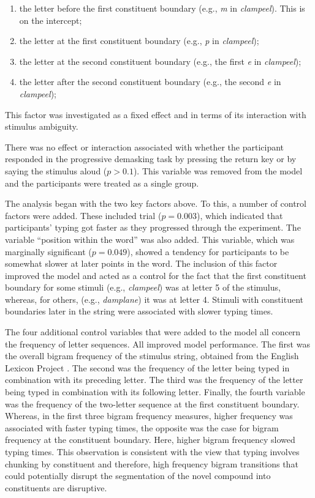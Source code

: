 \documentclass[output=paper]{langsci/langscibook}
\begin{document}
\begin{enumerate}
\item the letter before the first constituent boundary (e.g., \textit{m} in \textit{clampeel}). This is on the intercept; 
\item the letter at the first constituent boundary (e.g., \textit{p} in \textit{clampeel});
\item the letter at the second constituent boundary (e.g., the first \textit{e} in \textit{clampeel});
\item the letter after the second constituent boundary (e.g., the second \textit{e} in \textit{clampeel});
\end{enumerate}

This factor was investigated as a fixed effect and in terms of its interaction with stimulus ambiguity. 

There was no effect or interaction associated with whether the participant responded in the progressive demasking task by pressing the return key or by saying the stimulus aloud ($p>0.1$). This variable was removed from the model and the participants were treated as a single group.

The analysis began with the two key factors above. To this, a number of control factors were added. These included trial ($p=0.003$), which indicated that participants' typing got faster as they progressed through the experiment. The variable ``position within the word'' was also added. This variable, which was marginally significant ($p=0.049$), showed a tendency for participants to be somewhat slower at later points in the word. The inclusion of this factor improved the model and acted as a control for the fact that the first constituent boundary for some stimuli (e.g., \textit{clampeel}) was at letter 5 of the stimulus, whereas, for others, (e.g., \textit{damplane}) it was at letter 4. Stimuli with constituent boundaries later in the string were associated with slower typing times.

The four additional control variables that were added to the model all concern the frequency of letter sequences. All improved model performance. The first was the overall bigram frequency of the stimulus string, obtained from the English Lexicon Project \citep{BalotaEtAl2007}. The second was the frequency of the letter being typed in combination with its preceding letter. The third was the frequency of the letter being typed in combination with its following letter. Finally, the fourth variable was the frequency of the two-letter sequence at the first constituent boundary. Whereas, in the first three bigram frequency measures, higher frequency was associated with faster typing times, the opposite was the case for bigram frequency at the constituent boundary. Here, higher bigram frequency slowed typing times. This observation is consistent with the view that typing involves chunking by constituent and therefore, high frequency bigram transitions that could potentially disrupt the segmentation of the novel compound into constituents are disruptive.
\end{document}
